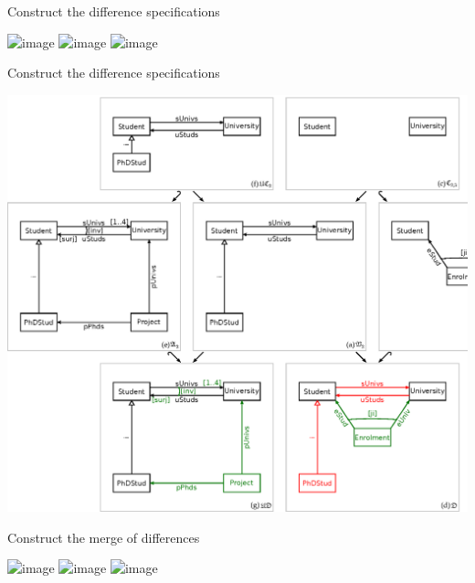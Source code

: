 \documentclass[dvips,slidetop,mathserif,brown]{beamer}
\begin{document}
\begin{frame}{Construct the difference specifications}
  \begin{center}
    \includegraphics<1>{po_ud_d_md_3}
    \includegraphics<2>{po_ud_d_md_4}
    \includegraphics<3>{po_ud_d_md_5}
  \end{center}
\end{frame}

\begin{frame}{Construct the difference specifications}
  \begin{center}
    \includegraphics[scale=0.4]{ex_project_vc_standard_ud_d}
  \end{center}
\end{frame}

\begin{frame}{Construct the merge of differences}
  \begin{center}
    \includegraphics<1>{po_ud_d_md_5}
    \includegraphics<2>{po_ud_d_md_6}
    \includegraphics<3>{po_ud_d_md_7}
  \end{center}
\end{frame}
\end{document}
